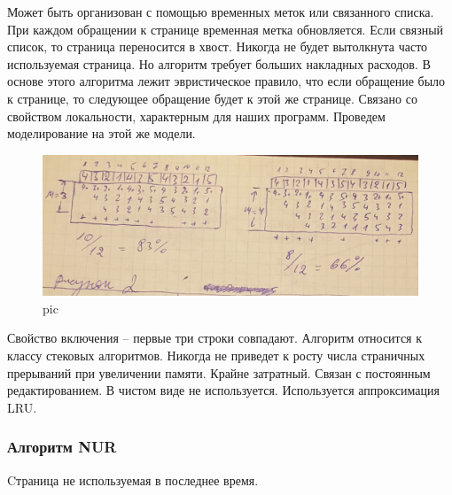 Может быть организован с помощью временных меток или связанного списка. При каждом обращении к странице временная метка обновляется. Если связный список, то страница переносится в хвост. Никогда не будет вытолкнута часто используемая страница. Но алгоритм требует больших накладных расходов. В основе этого алгоритма лежит эвристическое правило, что если обращение было к странице, то следующее обращение будет к этой же странице. Связано со свойством локальности, характерным для наших программ. Проведем моделирование на этой же модели.

\begin{figure}[H]
    \centering
    \includegraphics[width=\textwidth]{pic/9.png}
    \caption{pic}
\end{figure}

Свойство включения – первые три строки совпадают. Алгоритм относится к классу стековых алгоритмов. Никогда не приведет к росту числа страничных прерываний при увеличении памяти. Крайне затратный. Связан с постоянным редактированием. В чистом виде не используется. Используется аппроксимация LRU.

\subsubsection{Алгоритм NUR}

Cтраница не используемая в последнее время. 

